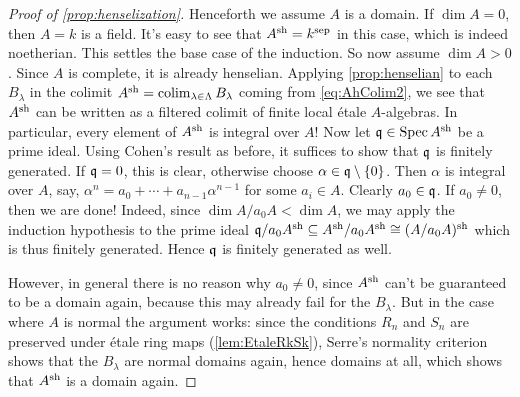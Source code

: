 \documentclass[a4paper, 10pt, oneside, DIV=9, chapterprefix=true, numbers=enddot, bibliography=totoc]{scrbook}
\begin{document}
\begin{proof}[Proof of \cref{prop:henselization}]
	Henceforth we assume $A$ is a domain. If $\dim A=0$, then $A=k$ is a field. It's easy to see that $A^{\mathrm{sh}}=k^{\mathrm{sep}}$ in this case, which is indeed noetherian. This settles the base case of the induction. So now assume $\dim A>0$. Since $A$ is complete, it is already henselian. Applying \cref{prop:henselian} to each $B_\lambda$ in the colimit $A^{\mathrm{sh}}=\operatorname*{colim}_{\lambda\in\Lambda}B_\lambda$ coming from \cref{eq:AhColim2}, we see that $A^{\mathrm{sh}}$ can be written as a filtered colimit of finite local étale $A$-algebras. In particular, every element of $A^{\mathrm{sh}}$ is integral over $A$! Now let $\mathfrak{q}\in\operatorname{Spec} A^{\mathrm{sh}}$ be a prime ideal. Using Cohen's result as before, it suffices to show that $\mathfrak{q}$ is finitely generated. If $\mathfrak{q}=0$, this is clear, otherwise choose $\alpha\in\mathfrak{q}\setminus\{0\}$. Then $\alpha$ is integral over $A$, say, $\alpha^n=a_0+\dotsb+a_{n-1}\alpha^{n-1}$ for some $a_i\in A$. Clearly $a_0\in\mathfrak{q}$. If $a_0\neq 0$, then we are done! Indeed, since $\dim A/a_0A<\dim A$, we may apply the induction hypothesis to the prime ideal $\mathfrak{q}/a_0A^{\mathrm{sh}}\subseteq A^{\mathrm{sh}}/a_0A^{\mathrm{sh}}\cong (A/a_0A)^{\mathrm{sh}}$ which is thus finitely generated. Hence $\mathfrak{q}$ is finitely generated as well.
	
	However, in general there is no reason why $a_0\neq 0$, since $A^{\mathrm{sh}}$ can't be guaranteed to be a domain again, because this may already fail for the $B_\lambda$. But in the case where $A$ is normal the argument works: since the conditions $R_n$ and $S_n$ are preserved under étale ring maps (\cref{lem:EtaleRkSk}), Serre's normality criterion shows that the $B_\lambda$ are normal domains again, hence domains at all, which shows that $A^{\mathrm{sh}}$ is a domain again.
	

\end{proof}
\end{document}
